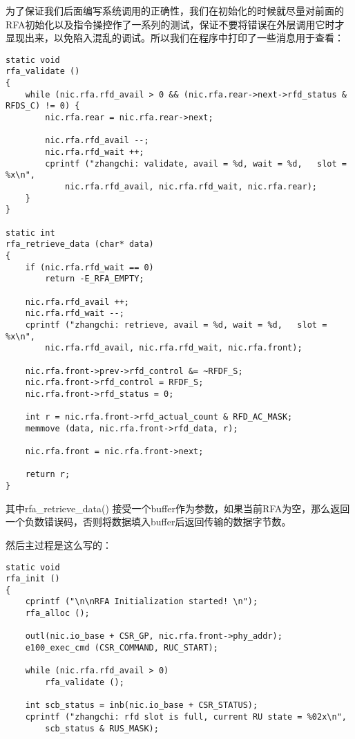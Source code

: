 \documentclass{article}
\newcommand{\funcname}[1]{{\ttfamily \small #1}}
\begin{document}
\begin{CJK*}{UTF8}{gkai}
为了保证我们后面编写系统调用的正确性，我们在初始化的时候就尽量对前面的RFA初始化以及指令操控作了一系列的测试，保证不要将错误在外层调用它时才显现出来，以免陷入混乱的调试。所以我们在程序中打印了一些消息用于查看：

\begin{lstlisting}[style=ccode, title={\scriptsize \ttfamily \bfseries kern/e100.c}]
static void
rfa_validate () 
{
    while (nic.rfa.rfd_avail > 0 && (nic.rfa.rear->next->rfd_status & RFDS_C) != 0) {
        nic.rfa.rear = nic.rfa.rear->next;

        nic.rfa.rfd_avail --;
        nic.rfa.rfd_wait ++;
        cprintf ("zhangchi: validate, avail = %d, wait = %d,   slot = %x\n", 
            nic.rfa.rfd_avail, nic.rfa.rfd_wait, nic.rfa.rear);
    }
}

static int
rfa_retrieve_data (char* data)
{
    if (nic.rfa.rfd_wait == 0)
        return -E_RFA_EMPTY;

    nic.rfa.rfd_avail ++;
    nic.rfa.rfd_wait --;
    cprintf ("zhangchi: retrieve, avail = %d, wait = %d,   slot = %x\n", 
        nic.rfa.rfd_avail, nic.rfa.rfd_wait, nic.rfa.front);

    nic.rfa.front->prev->rfd_control &= ~RFDF_S;
    nic.rfa.front->rfd_control = RFDF_S;
    nic.rfa.front->rfd_status = 0;

    int r = nic.rfa.front->rfd_actual_count & RFD_AC_MASK;
    memmove (data, nic.rfa.front->rfd_data, r);

    nic.rfa.front = nic.rfa.front->next;

    return r;
}\end{lstlisting}

其中\funcname{rfa\_retrieve\_data()} 接受一个buffer作为参数，如果当前RFA为空，那么返回一个负数错误码，否则将数据填入buffer后返回传输的数据字节数。

然后主过程是这么写的：

\begin{lstlisting}[style=ccode, title={\scriptsize \ttfamily \bfseries kern/e100.c: rfa\_init()}]
static void
rfa_init () 
{
    cprintf ("\n\nRFA Initialization started! \n");
    rfa_alloc ();

    outl(nic.io_base + CSR_GP, nic.rfa.front->phy_addr);
    e100_exec_cmd (CSR_COMMAND, RUC_START); 

    while (nic.rfa.rfd_avail > 0)
        rfa_validate ();

    int scb_status = inb(nic.io_base + CSR_STATUS);
    cprintf ("zhangchi: rfd slot is full, current RU state = %02x\n", 
        scb_status & RUS_MASK);


\end{lstlisting}
\end{CJK*}
\end{document}
